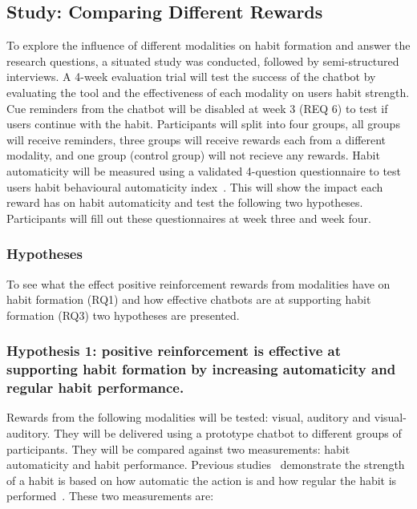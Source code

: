 \subsection{Study: Comparing Different Rewards} \label{study_comparing_rewards}
To explore the influence of different modalities on habit formation and answer the research questions, a situated study was conducted, followed by semi-structured interviews. A 4-week evaluation trial will test the success of the chatbot by evaluating the tool and the effectiveness of each modality on users habit strength.
Cue reminders from the chatbot will be disabled at week 3 (REQ 6) to test if users continue with the habit.
Participants will split into four groups, all groups will receive reminders, three groups will receive rewards each from a different modality,
and one group (control group) will not recieve any rewards. Habit automaticity will be measured using a validated 4-question questionnaire to test users habit behavioural
automaticity index~\cite{article_4q_SRBAI}. This will show the impact each reward has on habit automaticity and test the following two hypotheses.
Participants will fill out these questionnaires at week three and week four.

\subsubsection{Hypotheses} \label{hypothese}
To see what the effect positive reinforcement rewards from modalities have on habit formation (RQ1) and how effective chatbots are at supporting habit formation (RQ3) two hypotheses are presented.

\subsubsection*{Hypothesis 1: positive reinforcement is effective at supporting habit formation by increasing automaticity and regular habit performance.}
Rewards from the following modalities will be tested: visual, auditory and visual-auditory. They will be delivered using a prototype chatbot to different groups of participants. They will be compared against two measurements: habit automaticity and habit performance. Previous studies~\cite{article_habit_strength, article_4q_SRBAI} demonstrate the strength of a habit is based on how automatic the action is and how regular the habit is performed~\cite{article_promoting_habit_formation, article_experiences_of_habit_formation}. These two measurements are:

